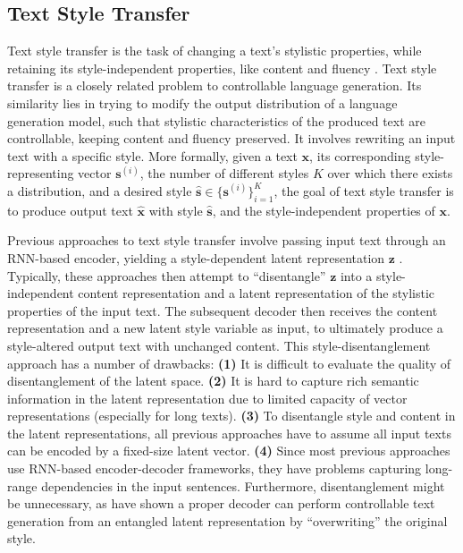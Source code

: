 \subsection{Text Style Transfer}
Text style transfer is the task of changing a text's stylistic properties, while retaining its style-independent properties, like content and fluency \citep{dai2019style}. Text style transfer is a closely related problem to controllable language generation. Its similarity lies in trying to modify the output distribution of a language generation model, such that stylistic characteristics of the produced text are controllable, keeping content and fluency preserved. It involves rewriting an input text with a specific style. More formally, given a text $\textbf{x}$, its corresponding style-representing vector $\textbf{s}^{(i)}$, the number of different styles $K$ over which there exists a distribution, and a desired style $\hat{\textbf{s}} \in \{\textbf{s}^{(i)}\}_{i = 1}^{K}$, the goal of text style transfer is to produce output text $\hat{\textbf{x}}$ with style $\hat{\textbf{s}}$, and the style-independent properties of $\textbf{x}$. 

Previous approaches to text style transfer involve passing input text through an RNN-based encoder, yielding a style-dependent latent representation $\textbf{z}$ \citep{zhang2018styletranslation}. Typically, these approaches then attempt to ``disentangle'' $\textbf{z}$ into a style-independent content representation and a latent representation of the stylistic properties of the input text. The subsequent decoder then receives the content representation and a new latent style variable as input, to ultimately produce a style-altered output text with unchanged content. This style-disentanglement approach has a number of drawbacks: \textbf{(1)} It is difficult to evaluate the quality of disentanglement of the latent space. \textbf{(2)} It is hard to capture rich semantic information in the latent representation due to limited capacity of vector representations (especially for long texts). \textbf{(3)} To disentangle style and content in the latent representations, all previous approaches have to assume all input texts can be encoded by a fixed-size latent vector. \textbf{(4)} Since most previous approaches use RNN-based encoder-decoder frameworks, they have problems capturing long-range dependencies in the input sentences. Furthermore, disentanglement might be unnecessary, as \cite{lample2018multipleattribute} have shown a proper decoder can perform controllable text generation from an entangled latent representation by ``overwriting'' the original style.

